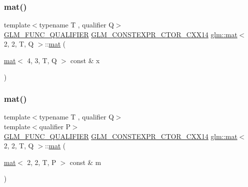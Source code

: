 \mbox{\label{structglm_1_1mat_3_012_00_012_00_01_t_00_01_q_01_4_aece09f8eb654228f28ed992288a3919a}} 
\subsubsection{\texorpdfstring{mat()}{mat()}\hspace{0.1cm}{\footnotesize\ttfamily [17/21]}}
{\footnotesize\ttfamily template$<$typename T , qualifier Q$>$ \\
\mbox{\hyperlink{setup_8hpp_a33fdea6f91c5f834105f7415e2a64407}{G\+L\+M\+\_\+\+F\+U\+N\+C\+\_\+\+Q\+U\+A\+L\+I\+F\+I\+ER}} \mbox{\hyperlink{setup_8hpp_a0900f9145e68bf6061b6f5e7be3fa751}{G\+L\+M\+\_\+\+C\+O\+N\+S\+T\+E\+X\+P\+R\+\_\+\+C\+T\+O\+R\+\_\+\+C\+X\+X14}} \mbox{\hyperlink{structglm_1_1mat}{glm\+::mat}}$<$ 2, 2, T, Q $>$\+::\mbox{\hyperlink{structglm_1_1mat}{mat}} (\begin{DoxyParamCaption}\item[{\mbox{\hyperlink{structglm_1_1mat}{mat}}$<$ 4, 3, T, Q $>$ const \&}]{x }\end{DoxyParamCaption})}

\mbox{\label{structglm_1_1mat_3_012_00_012_00_01_t_00_01_q_01_4_a135dbb9a94e04066f09624c6f3ab3b53}} 
\subsubsection{\texorpdfstring{mat()}{mat()}\hspace{0.1cm}{\footnotesize\ttfamily [18/21]}}
{\footnotesize\ttfamily template$<$typename T , qualifier Q$>$ \\
template$<$qualifier P$>$ \\
\mbox{\hyperlink{setup_8hpp_a33fdea6f91c5f834105f7415e2a64407}{G\+L\+M\+\_\+\+F\+U\+N\+C\+\_\+\+Q\+U\+A\+L\+I\+F\+I\+ER}} \mbox{\hyperlink{setup_8hpp_a0900f9145e68bf6061b6f5e7be3fa751}{G\+L\+M\+\_\+\+C\+O\+N\+S\+T\+E\+X\+P\+R\+\_\+\+C\+T\+O\+R\+\_\+\+C\+X\+X14}} \mbox{\hyperlink{structglm_1_1mat}{glm\+::mat}}$<$ 2, 2, T, Q $>$\+::\mbox{\hyperlink{structglm_1_1mat}{mat}} (\begin{DoxyParamCaption}\item[{\mbox{\hyperlink{structglm_1_1mat}{mat}}$<$ 2, 2, T, P $>$ const \&}]{m }\end{DoxyParamCaption})}



